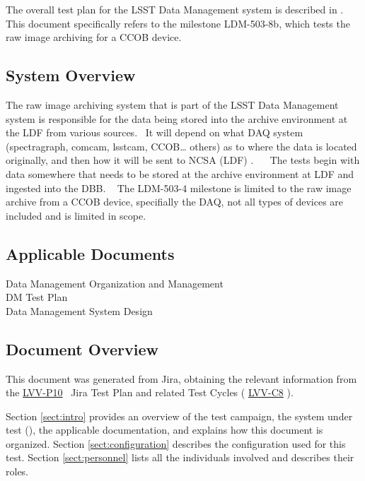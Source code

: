 \documentclass[DM,lsstdraft,STR,toc]{lsstdoc}
\begin{document}
The overall test plan for the LSST Data Management system is described
in .\\
This document specifically refers to the milestone LDM-503-8b, which
tests the raw image archiving for a CCOB device. ~



\subsection{System Overview}
\label{sect:systemoverview}

The raw image archiving system that is part of the LSST Data Management
system is responsible for the data being stored into the archive
environment at the LDF from various sources. ~It will depend on what DAQ
system (spectragraph, comcam, lsstcam, CCOB\ldots{} others) as to where
the data is located originally, and then how it will be sent to NCSA
(LDF) . ~ ~The tests begin with data somewhere that needs to be stored
at the archive environment at LDF and ingested into the DBB. ~ The
LDM-503-4 milestone is limited to the raw image archive from a CCOB
device, specifially the DAQ, not all types of devices are included and
is limited in scope. ~\\[2\baselineskip]

\subsection{Applicable Documents}\label{applicable-documents}

 Data Management Organization and Management\\
 DM Test Plan\\
 Data Management System Design~


\subsection{Document Overview}
\label{sect:docoverview}

This document was generated from Jira, obtaining the relevant information from the 
\href{https://jira.lsstcorp.org/secure/Tests.jspa#/testPlan/LVV-P10}{LVV-P10}
~Jira Test Plan and related Test Cycles (
  \href{https://jira.lsstcorp.org/secure/Tests.jspa#/testCycle/LVV-C8}{LVV-C8}
).


Section \ref{sect:intro} provides an overview of the test campaign, the system under test (\product{}), the applicable documentation, and explains how this document is organized.
Section \ref{sect:configuration}  describes the configuration used for this test.
Section \ref{sect:personnel} lists all the individuals involved and describes their roles.
\end{document}

